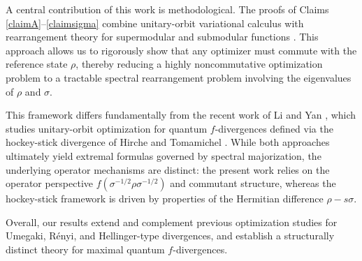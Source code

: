 \documentclass[10pt,reqno]{amsart}
\theoremstyle{break-italic}
\theoremstyle{break-italic}
\theoremstyle{break-italic}
\theoremstyle{break-italic}
\theoremstyle{break-italic}
\theoremstyle{break-italic}
\theoremstyle{break-italic}
\theoremstyle{break-italic}
\theoremstyle{break-roman}
\theoremstyle{standard}
\theoremstyle{varthm-roman}
\theoremstyle{varthm-italic}
\theoremstyle{varthm-roman-break}
\theoremstyle{varthm-italic-break}
\theoremstyle{varthm-roman-no-punctuation}
\theoremstyle{varthm-italic-no-punctuation}
\numberwithin{equation}{section}
\begin{document}
A central contribution of this work is methodological. The proofs of Claims~ \ref{claimA}--\ref{claimsigma}   combine unitary-orbit variational calculus with rearrangement theory for supermodular and submodular functions
\cite{HLP52,Top98}. This approach allows us to rigorously show that any optimizer must commute with the reference state $\rho$, thereby reducing a highly noncommutative optimization problem to a tractable spectral
rearrangement problem involving the eigenvalues of $\rho$ and $\sigma$.

This framework differs fundamentally from the recent work of Li and Yan \cite{LiYan}, which studies unitary-orbit optimization for quantum $f$-divergences defined via the hockey-stick divergence of Hirche and
Tomamichel \cite{HirTo}. While both approaches ultimately yield extremal formulas governed by spectral majorization, the underlying operator mechanisms are distinct: the present work relies on the operator perspective $f(\sigma^{-1/2}\rho\sigma^{-1/2})$ and commutant structure, whereas the hockey-stick framework is driven by properties of the Hermitian difference $\rho - s\sigma$.

Overall, our results extend and complement previous optimization studies for Umegaki, R\'enyi, and Hellinger-type divergences, and establish a structurally distinct theory for maximal quantum $f$-divergences. 
\end{document}
